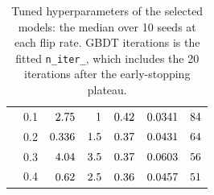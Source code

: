 \documentclass[11pt]{article}
\begin{document}
\begin{table}[!htbp]
\begin{tabular}{@{}l l r r r r r@{}}
    & 0.1 & $2.75$   & $1$   & $0.42$   & $0.0341$   & $84$ \\
    & 0.2 & $0.336$   & $1.5$   & $0.37$   & $0.0431$   & $64$ \\
    & 0.3 & $4.04$ & $3.5$ & $0.37$ & $0.0603$ & $56$ \\
    & 0.4 & $0.62$  & $2.5$  & $0.36$  & $0.0457$  & $51$ \\
\bottomrule
\end{tabular}
\caption{Tuned hyperparameters of the selected models: the median over 10 seeds at each flip
rate. GBDT iterations is the fitted \texttt{n\_iter\_}, which includes the 20 iterations after
the early-stopping plateau.}
\label{tab:hyper}
\end{table}
\end{document}
